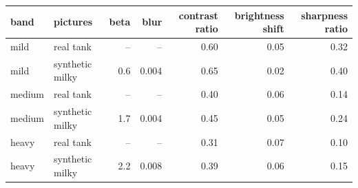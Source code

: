 \begin{tabular}{llrrrrr}
\toprule
band & pictures & beta & blur & contrast ratio & brightness shift & sharpness ratio \\
\midrule
mild & real tank & -- & -- & 0.60 & 0.05 & 0.32 \\
mild & synthetic milky & 0.6 & 0.004 & 0.65 & 0.02 & 0.40 \\
medium & real tank & -- & -- & 0.40 & 0.06 & 0.14 \\
medium & synthetic milky & 1.7 & 0.004 & 0.45 & 0.05 & 0.24 \\
heavy & real tank & -- & -- & 0.31 & 0.07 & 0.10 \\
heavy & synthetic milky & 2.2 & 0.008 & 0.39 & 0.06 & 0.15 \\
\bottomrule
\end{tabular}
